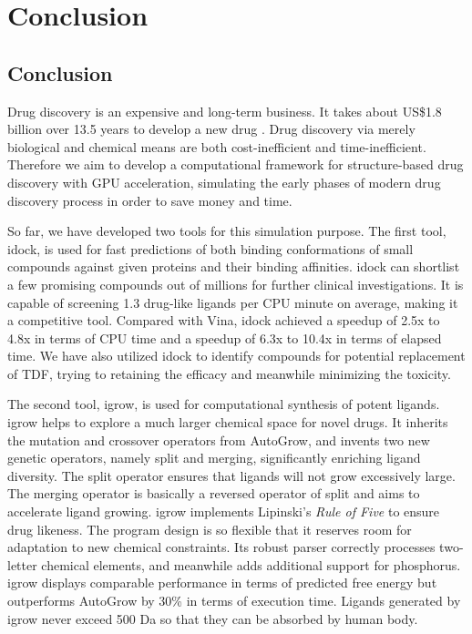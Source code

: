 \chapter{Conclusion}

\section{Conclusion}

Drug discovery is an expensive and long-term business. It takes about US\$1.8 billion over 13.5 years to develop a new drug \citep{716}. Drug discovery via merely biological and chemical means are both cost-inefficient and time-inefficient. Therefore we aim to develop a computational framework for structure-based drug discovery with GPU acceleration, simulating the early phases of modern drug discovery process in order to save money and time.

So far, we have developed two tools for this simulation purpose. The first tool, idock, is used for fast predictions of both binding conformations of small compounds against given proteins and their binding affinities. idock can shortlist a few promising compounds out of millions for further clinical investigations. It is capable of screening 1.3 drug-like ligands per CPU minute on average, making it a competitive tool. Compared with Vina, idock achieved a speedup of 2.5x to 4.8x in terms of CPU time and a speedup of 6.3x to 10.4x in terms of elapsed time. We have also utilized idock to identify compounds for potential replacement of TDF, trying to retaining the efficacy and meanwhile minimizing the toxicity.

The second tool, igrow, is used for computational synthesis of potent ligands. igrow helps to explore a much larger chemical space for novel drugs. It inherits the mutation and crossover operators from AutoGrow, and invents two new genetic operators, namely split and merging, significantly enriching ligand diversity. The split operator ensures that ligands will not grow excessively large. The merging operator is basically a reversed operator of split and aims to accelerate ligand growing. igrow implements Lipinski's \textit{Rule of Five} \citep{168} to ensure drug likeness. The program design is so flexible that it reserves room for adaptation to new chemical constraints. Its robust parser correctly processes two-letter chemical elements, and meanwhile adds additional support for phosphorus. igrow displays comparable performance in terms of predicted free energy but outperforms AutoGrow by 30\% in terms of execution time. Ligands generated by igrow never exceed 500 Da so that they can be absorbed by human body. 

